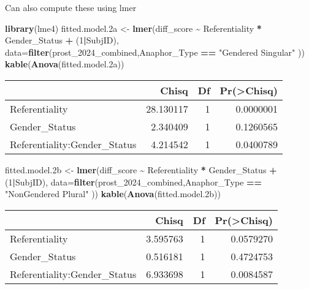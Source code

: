\documentclass[
  10pt,
]{article}
\newenvironment{Shaded}{\begin{snugshade}}{\end{snugshade}}
\newcommand{\AttributeTok}[1]{\textcolor[rgb]{0.13,0.29,0.53}{#1}}
\newcommand{\DecValTok}[1]{\textcolor[rgb]{0.00,0.00,0.81}{#1}}
\newcommand{\FloatTok}[1]{\textcolor[rgb]{0.00,0.00,0.81}{#1}}
\newcommand{\FunctionTok}[1]{\textcolor[rgb]{0.13,0.29,0.53}{\textbf{#1}}}
\newcommand{\NormalTok}[1]{#1}
\newcommand{\OtherTok}[1]{\textcolor[rgb]{0.56,0.35,0.01}{#1}}
\newcommand{\SpecialCharTok}[1]{\textcolor[rgb]{0.81,0.36,0.00}{\textbf{#1}}}
\newcommand{\StringTok}[1]{\textcolor[rgb]{0.31,0.60,0.02}{#1}}
\begin{document}
Can also compute these using lmer

\begin{Shaded}
\begin{Highlighting}[]
\FunctionTok{library}\NormalTok{(lme4)}
\NormalTok{fitted.model}\FloatTok{.2}\NormalTok{a }\OtherTok{\textless{}{-}} \FunctionTok{lmer}\NormalTok{(diff\_score }\SpecialCharTok{\textasciitilde{}}\NormalTok{ Referentiality }\SpecialCharTok{*}\NormalTok{ Gender\_Status  }\SpecialCharTok{+}\NormalTok{ (}\DecValTok{1}\SpecialCharTok{|}\NormalTok{SubjID), }\AttributeTok{data=}\FunctionTok{filter}\NormalTok{(prost\_2024\_combined,Anaphor\_Type }\SpecialCharTok{==} \StringTok{"Gendered Singular"}\NormalTok{ ))}
\FunctionTok{kable}\NormalTok{(}\FunctionTok{Anova}\NormalTok{(fitted.model}\FloatTok{.2}\NormalTok{a))}
\end{Highlighting}
\end{Shaded}

\begin{longtable}[]{@{}lrrr@{}}
\toprule\noalign{}
& Chisq & Df & Pr(\textgreater Chisq) \\
\midrule\noalign{}
\endhead
\bottomrule\noalign{}
\endlastfoot
Referentiality & 28.130117 & 1 & 0.0000001 \\
Gender\_Status & 2.340409 & 1 & 0.1260565 \\
Referentiality:Gender\_Status & 4.214542 & 1 & 0.0400789 \\
\end{longtable}

\begin{Shaded}
\begin{Highlighting}[]
\NormalTok{fitted.model}\FloatTok{.2}\NormalTok{b }\OtherTok{\textless{}{-}} \FunctionTok{lmer}\NormalTok{(diff\_score }\SpecialCharTok{\textasciitilde{}}\NormalTok{ Referentiality }\SpecialCharTok{*}\NormalTok{ Gender\_Status  }\SpecialCharTok{+}\NormalTok{ (}\DecValTok{1}\SpecialCharTok{|}\NormalTok{SubjID), }\AttributeTok{data=}\FunctionTok{filter}\NormalTok{(prost\_2024\_combined,Anaphor\_Type }\SpecialCharTok{==} \StringTok{"NonGendered Plural"}\NormalTok{ ))}
\FunctionTok{kable}\NormalTok{(}\FunctionTok{Anova}\NormalTok{(fitted.model}\FloatTok{.2}\NormalTok{b))}
\end{Highlighting}
\end{Shaded}

\begin{longtable}[]{@{}lrrr@{}}
\toprule\noalign{}
& Chisq & Df & Pr(\textgreater Chisq) \\
\midrule\noalign{}
\endhead
\bottomrule\noalign{}
\endlastfoot
Referentiality & 3.595763 & 1 & 0.0579270 \\
Gender\_Status & 0.516181 & 1 & 0.4724753 \\
Referentiality:Gender\_Status & 6.933698 & 1 & 0.0084587 \\
\end{longtable}
\end{document}
